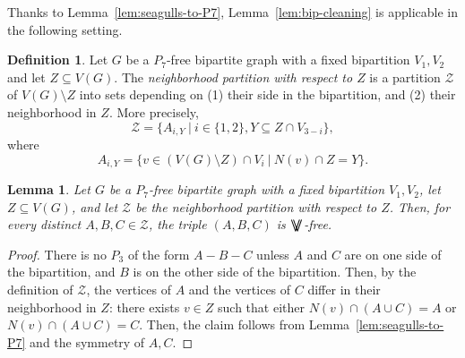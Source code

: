 \documentclass[11pt,a4paper]{article}
\newtheorem{lemma}[theorem]{Lemma}
\theoremstyle{definition}
\newtheorem{definition}[theorem]{Definition}
\newcommand{\VV}{$\bigvee\mkern-15mu\bigvee$}
\begin{document}
Thanks to Lemma~\ref{lem:seagulls-to-P7}, Lemma~\ref{lem:bip-cleaning} is applicable in the following setting.
\begin{definition}
    Let $G$ be a $P_7$-free bipartite graph with a fixed bipartition $V_1,V_2$ and let $Z \subseteq V(G)$. 
    The \emph{neighborhood partition with respect to $Z$} is a partition $\mathcal{Z}$ of $V(G) \setminus Z$ into sets depending on (1) their side in the bipartition, and (2) their neighborhood in $Z$.
    More precisely, 
    \[ \mathcal{Z} = \{ A_{i,Y}~|~ i \in \{1,2\}, Y \subseteq Z \cap V_{3-i} \}, \]
    where
    \[ A_{i,Y} = \{v \in (V(G) \setminus Z) \cap V_i ~|~ N(v) \cap Z = Y \}. \]
\end{definition}
\begin{lemma}\label{lem:bip-cleaning-apply}
    Let $G$ be a $P_7$-free bipartite graph with a fixed bipartition $V_1,V_2$, let $Z \subseteq V(G)$,
    and let $\mathcal{Z}$ be the neighborhood partition  with respect to $Z$.
    Then, for every distinct $A,B,C \in \mathcal{Z}$, the triple $(A,B,C)$ is \VV-free. 
\end{lemma}
\begin{proof}
    There is no $P_3$ of the form $A-B-C$ unless $A$ and $C$ are on one side of the bipartition, and $B$ is on 
    the other side of the bipartition. Then, by the definition of $\mathcal{Z}$, the vertices of $A$ and the vertices of $C$
    differ in their neighborhood in $Z$: there exists $v \in Z$ such that either $N(v) \cap (A \cup C) = A$ or $N(v) \cap (A \cup C) = C$. Then, the claim follows from Lemma~\ref{lem:seagulls-to-P7} and the symmetry of $A,C$.
\end{proof}
\end{document}
